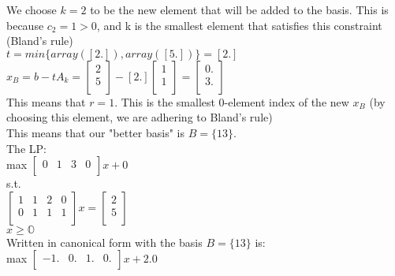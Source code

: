 \documentclass{article}
\begin{document}
We choose $k = 2$ to be the new element that will be added to the basis. This is because $c_2 = 1 > 0$, and k is the smallest element that satisfies this constraint (Bland's rule)\\ 

$t = min\{array([2.]), array([5.])\} = [2.]$ \\ 

$x_B = b - tA_k = \begin{bmatrix}
  2\\
  5\\
\end{bmatrix} - [2.]\begin{bmatrix}
  1\\
  1\\
\end{bmatrix} = \begin{bmatrix}
  0.\\
  3.\\
\end{bmatrix}$ \\

This means that $r = 1$. This is the smallest 0-element index of the new $x_B$ (by choosing this element, we are adhering to Bland's rule)\\

This means that our "better basis" is $B = \{1 3\}$. \\

The LP: \\
 max $\begin{bmatrix}
  0 & 1 & 3 & 0\\
\end{bmatrix}x + 0$ \\

s.t. \\
$\begin{bmatrix}
  1 & 1 & 2 & 0\\
  0 & 1 & 1 & 1\\
\end{bmatrix}x = \begin{bmatrix}
  2\\
  5\\
\end{bmatrix}$\\
$x \geq\mathbb{O}$ \\

Written in canonical form with the basis $B = \{1 3\}$ is: \\

max $\begin{bmatrix}
  -1. & 0. & 1. & 0.\\
\end{bmatrix}x + 2.0$ \\
\end{document}
